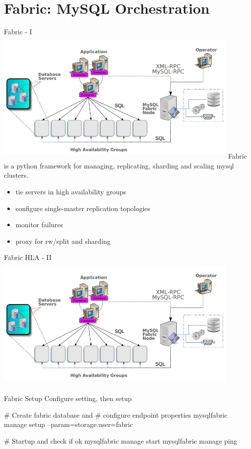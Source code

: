 \documentclass{beamer}[10]
\begin{document}
\section{Fabric: MySQL Orchestration}
\begin{pyframe}{Fabric - I}
\includegraphics[height=6.6cm,width=12cm]{images/mysql-fabric-hla.jpg}
Fabric is a python framework for managing, replicating, sharding and scaling mysql clusters.
\begin{itemize}
\item tie servers in high availability groups
\item configure single-master replication topologies
\item monitor failures
\item proxy for rw/split and sharding
\end{itemize}
\end{pyframe}


\begin{pyframe}{Fabric HLA - II}
\includegraphics[height=6.6cm,width=12cm]{images/mysql-fabric-hla.jpg}
\end{pyframe}


\begin{pyframe}{Fabric Setup}
Configure  setting, then setup
\begin{bashcode}
# Create fabric database and
# configure endpoint properties
mysqlfabric manage setup --param=storage.user=fabric

# Startup and check if ok
mysqlfabric manage start
mysqlfabric manage ping
\end{bashcode}
\end{pyframe}
\end{document}
